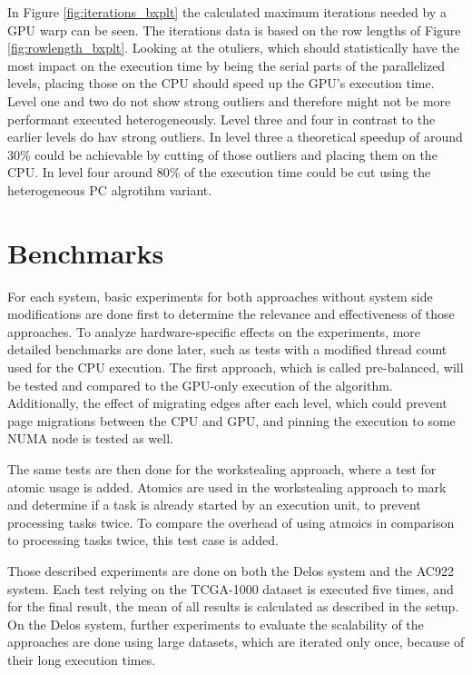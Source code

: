 In Figure \ref{fig:iterations_bxplt} the calculated maximum iterations needed by a GPU warp can be seen. The iterations data is based on the row lengths of Figure \ref{fig:rowlength_bxplt}. Looking at the otuliers, which should statistically have the most impact on the execution time by being the serial parts of the parallelized levels, placing those on the CPU should speed up the GPU's execution time. Level one and two do not show strong outliers and therefore might not be more performant executed heterogeneously. Level three and four in contrast to the earlier levels do hav strong outliers. In level three a theoretical speedup of around 30\% could be achievable by cutting of those outliers and placing them on the CPU. In level four around 80\% of the execution time could be cut using the heterogeneous PC algrotihm variant.

\section{Benchmarks}
\label{chap:benchmarks}
For each system, basic experiments for both approaches without system side modifications are done first to determine the relevance and effectiveness of those approaches. To analyze hardware-specific effects on the experiments, more detailed benchmarks are done later, such as tests with a modified thread count used for the CPU execution.
The first approach, which is called pre-balanced, will be tested and compared to the GPU-only execution of the algorithm. Additionally, the effect of migrating edges after each level, which could prevent page migrations between the CPU and GPU, and pinning the execution to some NUMA node is tested as well.

The same tests are then done for the workstealing approach, where a test for atomic usage is added. Atomics are used in the workstealing approach to mark and determine if a task is already started by an execution unit, to prevent processing tasks twice. To compare the overhead of using atmoics in comparison to processing tasks twice, this test case is added.

Those described experiments are done on both the Delos system and the AC922 system. Each test relying on the TCGA-1000 dataset is executed five times, and for the final result, the mean of all results is calculated as described in the setup. On the Delos system, further experiments to evaluate the scalability of the approaches are done using large datasets, which are iterated only once, because of their long execution times.

